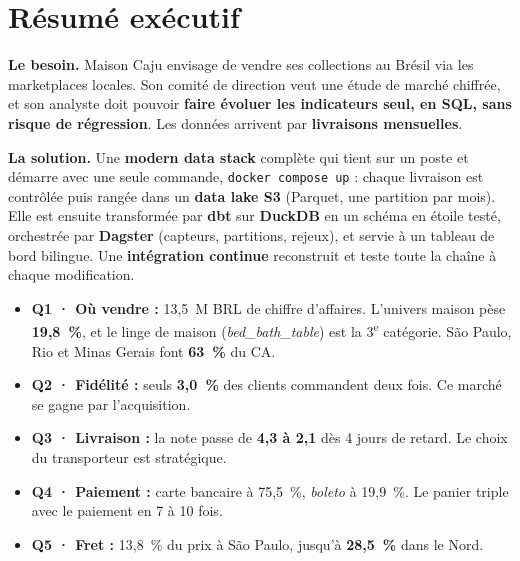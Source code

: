 \documentclass[11pt, a4paper, oneside, headings=normal, numbers=noenddot, DIV=12]{scrartcl}
\begin{document}
\begingroup
{}
\setcounter{tocdepth}{2}
\tableofcontents
\endgroup
\clearpage

\section{Résumé exécutif}\label{sec:resume}

\textbf{Le besoin.} Maison Caju envisage de vendre ses collections au Brésil via les marketplaces locales. Son comité de direction veut
une étude de marché chiffrée, et son analyste doit pouvoir \textbf{faire évoluer les indicateurs seul, en SQL, sans risque de régression}.
Les données arrivent par \textbf{livraisons mensuelles}.

\textbf{La solution.} Une \textbf{modern data stack} complète qui tient sur un poste et démarre avec une seule commande, \texttt{docker compose up} :
chaque livraison est contrôlée puis rangée dans un \textbf{data lake S3} (Parquet, une partition par mois). Elle est ensuite transformée par
\textbf{dbt} sur \textbf{DuckDB} en un schéma en étoile testé, orchestrée par \textbf{Dagster} (capteurs, partitions, rejeux), et servie
à un tableau de bord bilingue. Une \textbf{intégration continue} reconstruit et teste toute la chaîne à chaque modification.


\begin{keybox}
\begin{itemize}[leftmargin=1.2em]
  \item \textbf{Q1 · Où vendre :} 13,5~M BRL de chiffre d'affaires. L'univers maison pèse \textbf{19,8~\%}, et le linge de maison
        (\emph{bed\_bath\_table}) est la 3\textsuperscript{e} catégorie. São Paulo, Rio et Minas Gerais font \textbf{63~\%} du CA.
  \item \textbf{Q2 · Fidélité :} seuls \textbf{3,0~\%} des clients commandent deux fois. Ce marché se gagne par l'acquisition.
  \item \textbf{Q3 · Livraison :} la note passe de \textbf{4,3 à 2,1} dès 4 jours de retard. Le choix du transporteur est stratégique.
  \item \textbf{Q4 · Paiement :} carte bancaire à 75,5~\%, \emph{boleto} à 19,9~\%. Le panier triple avec le paiement en 7 à 10 fois.
  \item \textbf{Q5 · Fret :} 13,8~\% du prix à São Paulo, jusqu'à \textbf{28,5~\%} dans le Nord.
\end{itemize}
\end{keybox}
\end{document}
